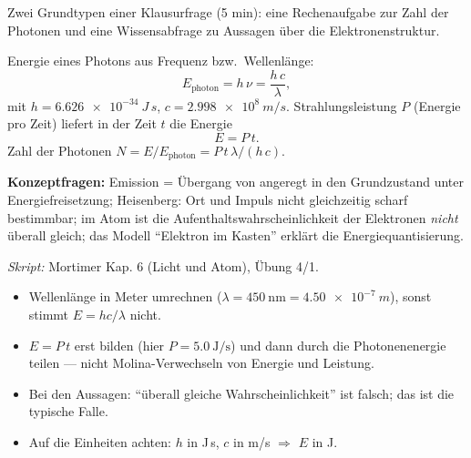 

Zwei Grundtypen einer Klausurfrage (5 min): eine Rechenaufgabe zur Zahl der
Photonen und eine Wissensabfrage zu Aussagen über die Elektronenstruktur.

\begin{werkzeugkasten}
Energie eines Photons aus Frequenz bzw.\ Wellenlänge:
\begin{equation}
  E_{\text{photon}} = h\,\nu = \frac{h\,c}{\lambda},
\end{equation}
mit $h = \qty{6.626e-34}{J\,s}$, $c = \qty{2.998e8}{m/s}$.
Strahlungsleistung $P$ (Energie pro Zeit) liefert in der Zeit $t$ die Energie
\begin{equation}
  E = P\,t.
\end{equation}
Zahl der Photonen $N = E / E_{\text{photon}} = P\,t\,\lambda /(h\,c)$.

\textbf{Konzeptfragen:} Emission = Übergang von angeregt in den Grundzustand
unter Energiefreisetzung; Heisenberg: Ort und Impuls nicht gleichzeitig
scharf bestimmbar; im Atom ist die Aufenthaltswahrscheinlichkeit der
Elektronen \emph{nicht} überall gleich; das Modell ``Elektron im Kasten''
erklärt die Energiequantisierung.

\textit{Skript:} Mortimer Kap. 6 (Licht und Atom), Übung 4/1.
\end{werkzeugkasten}

\begin{achtung}
\begin{itemize}
  \item Wellenlänge in Meter umrechnen ($\lambda = 450\ \mathrm{nm}
        = \qty{4.50e-7}{m}$), sonst stimmt $E = hc/\lambda$ nicht.
  \item $E = P\,t$ erst bilden (hier $P = 5.0\ \mathrm{J/s}$) und dann durch
        die Photonenenergie teilen --- nicht Molina-Verwechseln von Energie und
        Leistung.
  \item Bei den Aussagen: ``überall gleiche Wahrscheinlichkeit'' ist falsch;
        das ist die typische Falle.
  \item Auf die Einheiten achten: $h$ in J\,s, $c$ in m/s $\Rightarrow$
        $E$ in J.
\end{itemize}
\end{achtung}
